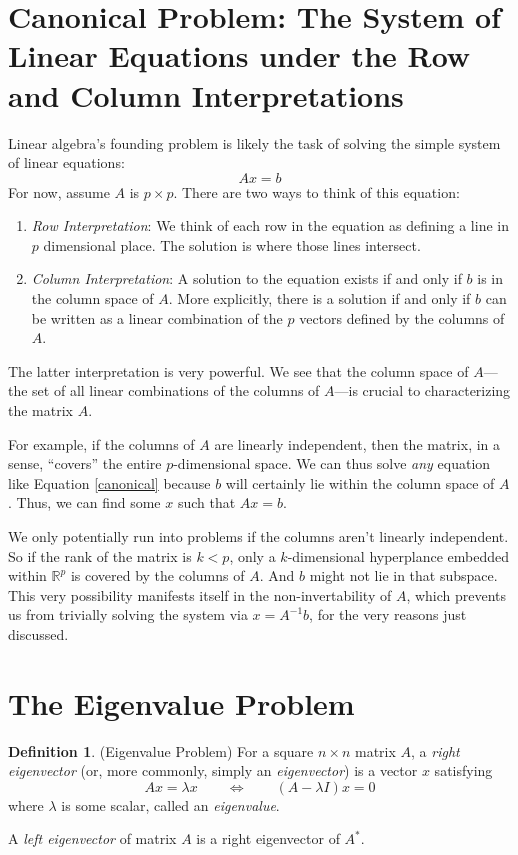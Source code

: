 \documentclass[12pt]{article}
\theoremstyle{plain}
\theoremstyle{definition}
\newtheorem{defn}[thm]{Definition}
\theoremstyle{remark}
\begin{document}
\section{Canonical Problem: The System of Linear Equations under the Row and Column Interpretations}

Linear algebra's founding problem is likely the task of solving the simple system of linear equations:
\begin{equation}
    \label{canonical}
    Ax = b
\end{equation}
For now, assume $A$ is $p\times p$. There are two ways to think of this equation:
\begin{enumerate}
    \item {\sl Row Interpretation}: We think of each row in the equation as defining a line in $p$ dimensional place. The solution is where those lines intersect.
    \item {\sl Column Interpretation}: A solution to the equation exists if and only if $b$ is in the column space of $A$. More explicitly, there is a solution if and only if $b$ can be written as a linear combination of the $p$ vectors defined by the columns of $A$.
\end{enumerate}
The latter interpretation is very powerful. We see that the column space of $A$---the set of all linear combinations of the columns of $A$---is crucial to characterizing the matrix $A$.

For example, if the columns of $A$ are linearly independent, then the matrix, in a sense, ``covers'' the entire $p$-dimensional space. We can thus solve \emph{any} equation like Equation \ref{canonical} because $b$ will certainly lie within the column space of $A$. Thus, we can find some $x$ such that $Ax=b$.

We only potentially run into problems if the columns aren't linearly independent. So if the rank of the matrix is $k<p$, only a $k$-dimensional hyperplance embedded within $\mathbb{R}^p$ is covered by the columns of $A$. And $b$ might not lie in that subspace. This very possibility manifests itself in the non-invertability of $A$, which prevents us from trivially solving the system via $x = A^{-1}b$, for the very reasons just discussed.



\section{The Eigenvalue Problem}

\begin{defn}{(Eigenvalue Problem)}
For a square $n\times n$ matrix $A$, a \emph{right eigenvector} (or,
more commonly, simply an \emph{eigenvector}) is a vector $x$ satisfying
\begin{equation}
  Ax = \lambda x
  \qquad \Leftrightarrow \qquad
  (A-\lambda I) x = 0
\end{equation}
where $\lambda$ is some scalar, called an \emph{eigenvalue}.

A \emph{left eigenvector} of matrix $A$ is a right eigenvector
of $A^*$.
\end{defn}
\end{document}

